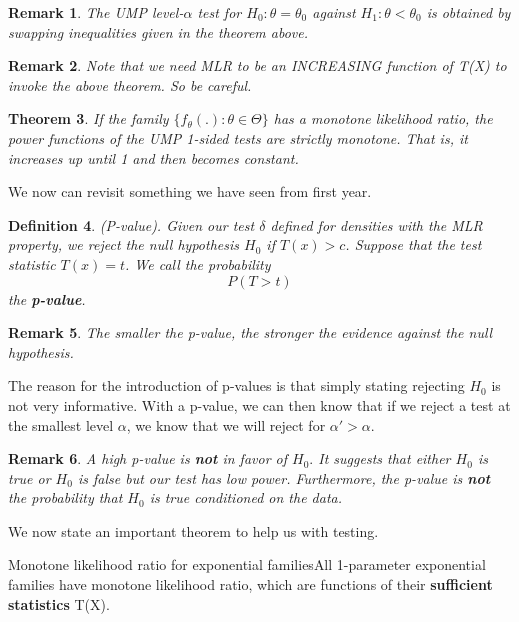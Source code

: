 \documentclass[twoside]{article}
\newcounter{lecnum}
\newtheorem{theorem}{Theorem}[lecnum]
\newtheorem{definition}[theorem]{Definition}
\newtheorem{remark}[theorem]{Remark}
\begin{document}
\begin{remark}The UMP level-$\alpha$ test for $H_0: \theta = \theta_0$ against $H_1: \theta < \theta_0$ is obtained by swapping inequalities given in the theorem above.
\end{remark}

\begin{remark}Note that we need MLR to be an INCREASING function of T(X) to invoke the above theorem. So be careful.
\end{remark}

\begin{theorem}If the family $\{f_{\theta}(.): \theta \in \Theta\}$ has a monotone likelihood ratio, the power functions of the UMP 1-sided tests are strictly monotone. That is, it increases up until 1 and then becomes constant.
\end{theorem}


We now can revisit something we have seen from first year. 
\begin{definition}(P-value). Given our test $\delta$ defined for densities with the MLR property, we reject the null hypothesis $H_0$ if $T(x) > c$. Suppose that the test statistic $T(x) = t$. We call the probability 
$$
P(T > t)
$$
the \textbf{p-value}.
\end{definition}

\begin{remark}The smaller the p-value, the stronger the evidence against the null hypothesis.
\end{remark}

The reason for the introduction of p-values is that simply stating rejecting $H_0$ is not very informative. With a p-value, we can then know that if we reject a test at the smallest level $\alpha$, we know that we will reject for $\alpha' > \alpha.$\\
\begin{remark}A high p-value is \textbf{not} in favor of $H_0.$ It suggests that either $H_0$ is true or $H_0$ is false but our test has low power. Furthermore, the p-value is \textbf{not} the probability that $H_0$ is true conditioned on the data.
\end{remark}
We now state an important theorem to help us with testing.

\begin{theorem_exam}{Monotone likelihood ratio for exponential families}{}All 1-parameter exponential families have monotone likelihood ratio, which are functions of their \textbf{sufficient statistics} T(X).
\end{theorem_exam}
\end{document}
